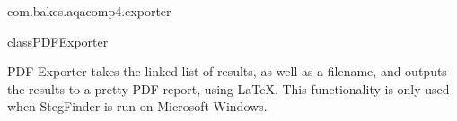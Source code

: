 \begin{texdocpackage}{com.bakes.aqacomp4.exporter}
\begin{texdocclass}{class}{PDFExporter}
\label{texdoclet:com.bakes.aqacomp4.exporter.PDFExporter}
\begin{texdocclassintro}
PDF Exporter takes the linked list of results, as well as a filename, and outputs the results to a pretty PDF report, using LaTeX. This functionality is only used when StegFinder is run on Microsoft Windows.
\end{texdocclassintro}
\begin{texdocclassconstructors}
\end{texdocclassconstructors}
\begin{texdocclassmethods}
\end{texdocclassmethods}
\end{texdocclass}


\end{texdocpackage}



